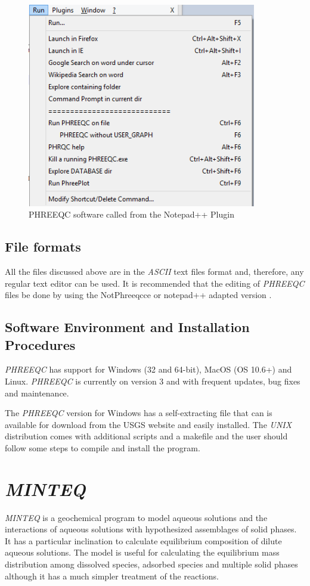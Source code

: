 \begin{figure}[ht!]
\centering
\includegraphics[width=100mm]{figures/notepad++run_menu.png}
\caption{PHREEQC software called from the Notepad++ Plugin}
\label{fig:phreeqc-notepad++3}
\end{figure}

\subsection{File formats}
All the files discussed above are in the \emph{ASCII} text files format and, therefore, any regular text editor can be used. 
It is recommended that the editing of \emph{PHREEQC} files be done by using the NotPhreeqcce or notepad++ adapted version \cite{NotPhree:11}.

\subsection{Software Environment and Installation Procedures}
\emph{PHREEQC} has support for Windows (32 and 64-bit), MacOS (OS 10.6+) and Linux. \emph{PHREEQC} is currently on version 3 and with frequent updates, bug fixes and maintenance.

The \emph{PHREEQC} version for Windows has a self-extracting file that can is available for download from the USGS website and easily installed. The \emph{UNIX} distribution comes with additional scripts and a makefile and the user should follow some steps to compile and install the program.

\section{\emph{MINTEQ}}
\emph{MINTEQ} is a geochemical program to model aqueous solutions and the interactions of aqueous solutions with hypothesized assemblages of solid phases. It has a particular inclination to calculate equilibrium composition of dilute aqueous solutions. The model is useful for calculating the equilibrium mass distribution among dissolved species, adsorbed species and multiple solid phases although it has a much simpler treatment of the reactions. 

